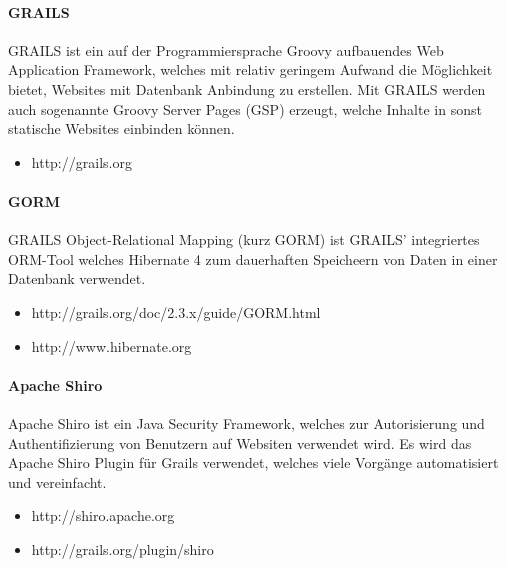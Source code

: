 \paragraph{GRAILS}
GRAILS ist ein auf der Programmiersprache Groovy aufbauendes Web Application Framework, welches mit relativ geringem Aufwand die Möglichkeit bietet, Websites mit Datenbank Anbindung zu erstellen. Mit GRAILS werden auch sogenannte Groovy Server Pages (GSP) erzeugt, welche Inhalte in sonst statische Websites einbinden können.
\begin{itemize}
\item http://grails.org
\end{itemize}
\paragraph{GORM}
GRAILS Object-Relational Mapping (kurz GORM) ist GRAILS' integriertes ORM-Tool welches Hibernate 4 zum dauerhaften Speicheern von Daten in einer Datenbank verwendet.
\begin{itemize}
\item http://grails.org/doc/2.3.x/guide/GORM.html
\item http://www.hibernate.org
\end{itemize}

\paragraph{Apache Shiro}
Apache Shiro ist ein Java Security Framework, welches zur Autorisierung und Authentifizierung von Benutzern auf Websiten verwendet wird. Es wird das Apache Shiro Plugin für Grails verwendet, welches viele Vorgänge automatisiert und vereinfacht.
\begin{itemize}
\item http://shiro.apache.org
\item http://grails.org/plugin/shiro
\end{itemize}
